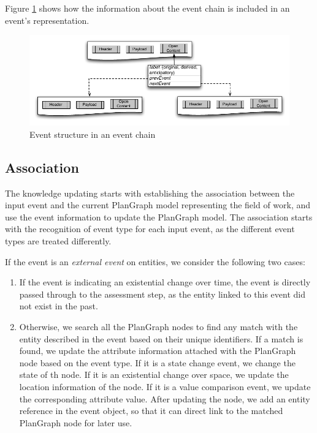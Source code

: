  Figure \ref{fig:event_chain_structure} shows how the information about the event chain is included in an event's representation. 

\begin{figure}[htbp] %
	\centering
	\includegraphics{event_chain_structure.pdf} 
	\caption{Event structure in an event chain}
	\label{fig:event_chain_structure}
\end{figure}

\subsection{Association} %
\label{sub:association}
The knowledge updating starts with establishing the association between the input event and the current PlanGraph model representing the field of work, and use the event information to update the PlanGraph model. The association starts with the recognition of event type for each input event, as the different event types are treated differently.

If the event is an \emph{external event} on entities, we consider the following two cases:
\begin{enumerate}
	\item If the event is indicating an existential change over time, the event is directly passed through to the assessment step, as the entity linked to this event did not exist in the past.
	\item Otherwise, we search all the PlanGraph nodes to find any match with the entity described in the event based on their unique identifiers. If a match is found, we update the attribute information attached with the PlanGraph node based on the event type. If it is a state change event, we change the state of th node. If it is an existential change over space, we update the location information of the node. If it is a value comparison event, we update the corresponding attribute value. After updating the node, we add an entity reference in the event object, so that it can direct link to the matched PlanGraph node for later use.
\end{enumerate}

